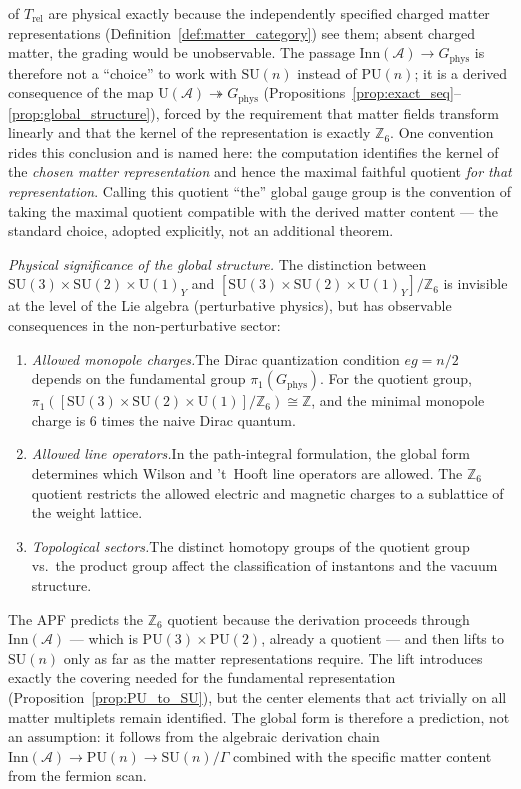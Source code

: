 \documentclass[11pt]{article}
\theoremstyle{definition}
\newcommand{\SU}{\mathrm{SU}}
\newcommand{\U}{\mathrm{U}}
\begin{document}
of $T_{\mathrm{rel}}$ are physical exactly because the independently
specified charged matter representations
(Definition~\ref{def:matter_category}) see them; absent charged
matter, the grading would be unobservable.
The passage $\mathrm{Inn}(\mathcal{A}) \to G_{\mathrm{phys}}$ is
therefore not a ``choice'' to work with $\SU(n)$ instead of
$\mathrm{PU}(n)$; it is a derived consequence of the map
$\mathrm{U}(\mathcal{A}) \twoheadrightarrow G_{\mathrm{phys}}$
(Propositions~\ref{prop:exact_seq}--\ref{prop:global_structure}),
forced by the requirement that matter fields transform linearly
and that the kernel of the representation is exactly
$\mathbb{Z}_6$.  One convention rides this conclusion and is named
here: the computation identifies the kernel of the \emph{chosen
matter representation} and hence the maximal faithful quotient
\emph{for that representation}.  Calling this quotient ``the'' global
gauge group is the convention of taking the maximal quotient
compatible with the derived matter content --- the standard choice,
adopted explicitly, not an additional theorem.

\smallskip\noindent\textit{Physical significance of the global
structure.}\quad
The distinction between $\SU(3) \times \SU(2) \times \U(1)_Y$ and
$[\SU(3) \times \SU(2) \times \U(1)_Y] / \mathbb{Z}_6$ is invisible
at the level of the Lie algebra (perturbative physics), but has
observable consequences in the non-perturbative sector:
\begin{enumerate}[label=(\alph*),nosep]
  \item \textit{Allowed monopole charges.}\quad The Dirac quantization
  condition $eg = n/2$ depends on the fundamental group
  $\pi_1(G_{\mathrm{phys}})$.  For the quotient group,
  $\pi_1([\SU(3) \times \SU(2) \times \U(1)] / \mathbb{Z}_6) \cong
  \mathbb{Z}$, and the minimal monopole charge is $6$ times the naive
  Dirac quantum.
  \item \textit{Allowed line operators.}\quad In the path-integral
  formulation, the global form determines which Wilson and 't~Hooft
  line operators are allowed.  The $\mathbb{Z}_6$ quotient restricts
  the allowed electric and magnetic charges to a sublattice of the
  weight lattice.
  \item \textit{Topological sectors.}\quad The distinct homotopy
  groups of the quotient group vs.\ the product group affect the
  classification of instantons and the vacuum structure.
\end{enumerate}
The APF predicts the $\mathbb{Z}_6$ quotient because the derivation
proceeds through $\mathrm{Inn}(\mathcal{A})$ --- which is
$\mathrm{PU}(3) \times \mathrm{PU}(2)$, already a quotient --- and
then lifts to $\SU(n)$ only as far as the matter representations
require.  The lift introduces exactly the covering needed for the
fundamental representation (Proposition~\ref{prop:PU_to_SU}), but the
center elements that act trivially on all matter multiplets remain
identified.  The global form is therefore a prediction, not an
assumption: it follows from the algebraic derivation chain
$\mathrm{Inn}(\mathcal{A}) \to \mathrm{PU}(n) \to \SU(n) / \Gamma$
combined with the specific matter content from the fermion scan.
\end{document}
